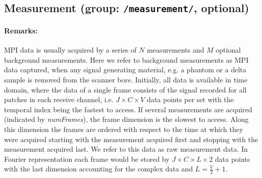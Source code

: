 \documentclass[landscape,a4paper]{article} %
\newcommand{\inl}[1]{\lstinline[columns=fixed]{#1}}
\begin{document}
\subsection{Measurement (group: \inl{/measurement/}, optional)}
\begin{multicols}{2}

\paragraph{Remarks:}
MPI data is usually acquired by a series of $N$ measurements and $M$ optional background measurements. Here we refer to background measurements as MPI data captured, when any signal generating material, e.g. a phantom or a delta sample is removed from the scanner bore. Initially, all data is available in time domain, where the data of a single frame consists of the signal recorded for all patches in each receive channel, i.e. $J \times C \times V$ data points per set with the temporal index being the fastest to access.  If several measurements are acquired (indicated by \textit{numFrames}), the frame dimension is the slowest to access. Along this dimension the frames are ordered with respect to the time at which they were acquired starting with the measurement acquired first and stopping with the measurement acquired last. We refer to this data as raw measurement data. In Fourier representation each frame would be stored by $J \times C\times L \times 2$ data points with the last dimension accounting for the complex data and $L=\frac V 2 +1$.


\end{multicols}
\end{document}
